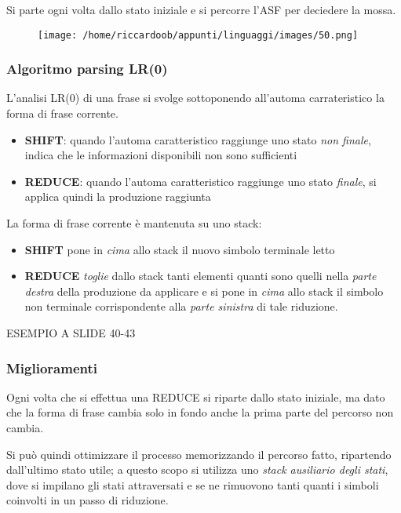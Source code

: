 Si parte ogni volta dallo stato iniziale e si percorre l'ASF per deciedere la mossa.

\begin{figure}[H]
    \centering
    \texttt{[image: /home/riccardoob/appunti/linguaggi/images/50.png]}
\end{figure}

\subsubsection{Algoritmo parsing LR(0)}
L'analisi LR(0) di una frase si svolge sottoponendo all'automa carrateristico la forma di frase corrente.

\begin{itemize}
    \item \textbf{SHIFT}: quando l'automa caratteristico raggiunge uno stato \textit{non finale}, indica che le informazioni disponibili non sono sufficienti
    \item \textbf{REDUCE}: quando l'automa caratteristico raggiunge uno stato \textit{finale}, si applica quindi la produzione raggiunta
\end{itemize}

La forma di frase corrente è mantenuta su uno stack:
\begin{itemize}
    \item \textbf{SHIFT} pone in \textit{cima} allo stack il nuovo simbolo terminale letto
    \item \textbf{REDUCE} \textit{toglie} dallo stack tanti elementi quanti sono quelli nella \textit{parte destra} della produzione da applicare e si pone in \textit{cima} allo stack il simbolo non terminale corrispondente alla \textit{parte sinistra} di tale riduzione.
\end{itemize}

ESEMPIO A SLIDE 40-43

\subsubsection{Miglioramenti}
Ogni volta che si effettua una REDUCE si riparte dallo stato iniziale, ma dato che la forma di frase cambia solo in fondo anche la prima parte del percorso non cambia.

Si può quindi ottimizzare il processo memorizzando il percorso fatto, ripartendo dall'ultimo stato utile; a questo scopo si utilizza uno \textit{stack ausiliario degli stati}, dove si impilano gli stati attraversati e se ne rimuovono tanti quanti i simboli coinvolti in un passo di riduzione.

